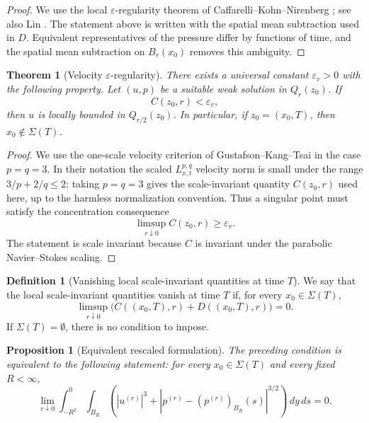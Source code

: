 \documentclass[11pt]{amsart}
\theoremstyle{plain}
\newtheorem{theorem}{Theorem}[section]
\newtheorem{proposition}[proposition]{Proposition}
\theoremstyle{definition}
\newtheorem{definition}[definition]{Definition}
\theoremstyle{remark}
\numberwithin{equation}{section}
\begin{document}
\begin{proof}
We use the local \(\varepsilon\)-regularity theorem of
Caffarelli--Kohn--Nirenberg \cite{CKN1982}; see also Lin \cite{Lin1998}.  The
statement above is written with the spatial mean subtraction used in \(D\).
Equivalent representatives of the pressure differ by functions of time, and
the spatial mean subtraction on \(B_r(x_0)\) removes this ambiguity.
\end{proof}

\begin{theorem}[Velocity \(\varepsilon\)-regularity]\label{p0:thm:velocity-ckn}
There exists a universal constant \(\varepsilon_v>0\) with the following
property.  Let \((u,p)\) be a suitable weak solution in \(Q_r(z_0)\).  If
\[
  C(z_0,r)<\varepsilon_v,
\]
then \(u\) is locally bounded in \(Q_{r/2}(z_0)\).  In particular, if
\(z_0=(x_0,T)\), then \(x_0\notin\Sigma(T)\).
\end{theorem}

\begin{proof}
We use the one-scale velocity criterion of
Gustafson--Kang--Tsai \cite{GustafsonKangTsai2007} in the case
\(p=q=3\).  In their notation the scaled \(L^{p,q}_{x,t}\) velocity norm is
small under the range \(3/p+2/q\le2\); taking \(p=q=3\) gives the
scale-invariant quantity \(C(z_0,r)\) used here, up to the harmless
normalization convention.  Thus a singular point must
satisfy the concentration consequence
\[
   \limsup_{r\downarrow0} C(z_0,r)\ge\varepsilon_v .
\]
The statement is scale invariant because \(C\) is invariant under the
parabolic Navier--Stokes scaling.
\end{proof}

\begin{definition}[Vanishing local scale-invariant quantities at time \(T\)]
We say that the local scale-invariant quantities vanish at time \(T\) if, for
every \(x_0\in\Sigma(T)\),
\[
  \limsup_{r\downarrow0}
  \bigl(C((x_0,T),r)+D((x_0,T),r)\bigr)=0.
\]
If \(\Sigma(T)=\emptyset\), there is no condition to impose.
\end{definition}

\begin{proposition}[Equivalent rescaled formulation]
\label{p0:prop:vanishing-rescaled}
The preceding condition is equivalent to the following statement: for every
\(x_0\in\Sigma(T)\) and every fixed \(R<\infty\),
\[
  \lim_{r\downarrow0}
  \int_{-R^2}^{0}\int_{B_R}
  \left(
  |u^{(r)}|^3+
  |p^{(r)}-(p^{(r)})_{B_R}(s)|^{3/2}
  \right)\,dy\,ds=0.
\]
\end{proposition}
\end{document}
